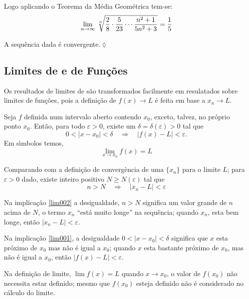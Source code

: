 Logo aplicando o Teorema da M\'{e}dia Geom\'{e}trica tem-se:
\begin{equation*}
  \displaystyle{\lim_{n\to \infty}\,{\sqrt[n]{\frac{2}{8}\cdot\frac{5}{23}\cdots\frac{n^2+1}{5n^2+3}}}_{}}=\frac{1}{5}
\end{equation*}

A sequ\^{e}ncia dada \'{e} convergente.\hfill \(\lozenge\)

\subsection{Limites de \Seqs e de Fun\c{c}\~{o}es}
Os resultados de limites de \seqs s\~{a}o transformados facilmente em resulatados sobre limites de fun\c{c}\~{o}es, pois a defini\c{c}\~{a}o de $f(x)\to L$ \'{e} feita em base a $x_n\to L$.

\begin{defi}
Seja $f$ definida num intervalo aberto contendo $x_0$, exceto, talvez, no pr\'{o}prio ponto $x_0$. Ent\~{a}o, para todo $\varepsilon>0$, existe um $\delta=\delta(\varepsilon)>0$ tal que
\begin{equation}\label{lim001}
    0<|x-x_0|<\delta\quad \Rightarrow\quad |f(x)-L|<\varepsilon.
\end{equation}
Em s\'{\i}mbolos temos,
\begin{equation*}
    \lim_{x\to x_0}f(x)=L
\end{equation*}
\end{defi}

Comparando com a defini\c{c}\~{a}o de converg\`{e}ncia de uma \seq $\{x_n\}$ para o limite $L$; para $\varepsilon>0$ dado, existe inteiro positivo $N\geq N(\varepsilon)$ tal que
\begin{equation}\label{lim002}
    n>N \quad \Rightarrow \quad |x_n -L|<\varepsilon
\end{equation}

Na implica\c{c}\~{a}o \eqref{lim002} a desigualdade,  $n> N$ significa um valor grande de $n$ acima 
de $N$, o termo $x_n$ ``est\'{a} muito longe'' na sequ\^{e}ncia; quando $x_n$, esta bem longe, 
ent\~{a}o $|x_n-L|<\varepsilon$.

Na implica\c{c}\~{a}o \eqref{lim001}, a desigualdade $0<|x-x_0|<\delta$ significa que $x$ esta 
pr\'{o}ximo de $x_0$  mas n\~{a}o \'{e} igual a $x_0$; quando $x$ esta bastante pr\'{o}ximo 
de $x_0$, mas n\~{a}o \'{e} igual a $x_0$, ent\~{a}o $|f(x)-L|<\varepsilon$.

Na defini\c{c}\~{a}o de limite, $\lim f(x)=L$ quando $x\to x_0$, o valor de $f(x_0)$ n\~{a}o necessita 
estar definido; mesmo que $f(x_0)$ esteja definido n\~{a}o \'{e} considerado no c\'{a}lculo do limite.

